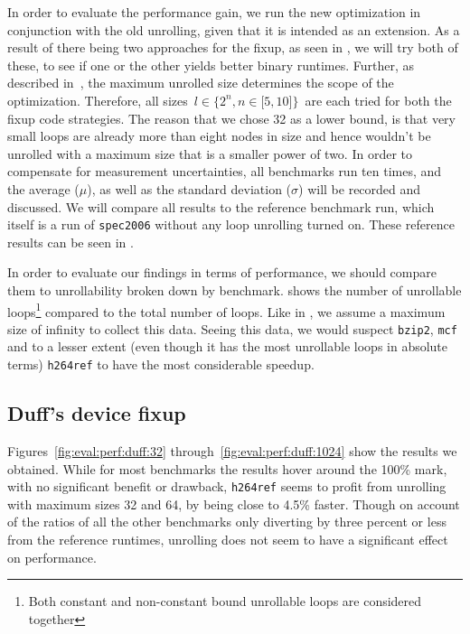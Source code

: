 In order to evaluate the performance gain, we run the new optimization in conjunction with the old unrolling, given that it is intended as an extension.
As a result of there being two approaches for the fixup, as seen in , we will try both of these, to see if one or the other yields better binary runtimes.
Further, as described in~, the maximum unrolled size determines  the scope of the optimization.
Therefore, all sizes~$l \in \{2^n, n \in \lbrack 5, 10 \rbrack \}$~are each tried for both the fixup code strategies.
The reason that we chose 32 as a lower bound, is that very small loops are already more than eight nodes in size and hence wouldn't be unrolled with a maximum size that is a smaller power of two.
In order to compensate for measurement uncertainties, all benchmarks run ten times, and the average ($\mu$), as well as the standard deviation ($\sigma$) will be recorded and discussed.
We will compare all results to the reference benchmark run, which itself is a run of \texttt{spec2006} without any loop unrolling turned on.
These reference results can be seen in .

In order to evaluate our findings in terms of performance, we should compare them to unrollability broken down by benchmark.
 shows the number of unrollable loops\footnote{Both constant and non-constant bound unrollable loops are considered together} compared to the total number of loops.
Like in , we assume a maximum size of infinity to collect this data.
Seeing this data, we would suspect \texttt{bzip2}, \texttt{mcf} and to a lesser extent (even though it has the most unrollable loops in absolute terms) \texttt{h264ref} to have the most considerable speedup.





\subsection{Duff's device fixup}\label{sec:eval:perf:duff}

Figures~\ref{fig:eval:perf:duff:32} through~\ref{fig:eval:perf:duff:1024} show the results we obtained.
While for most benchmarks the results hover around the 100\% mark, with no significant benefit or drawback, \texttt{h264ref} seems to profit from unrolling with maximum sizes 32 and 64, by being close to 4.5\% faster.
Though on account of the ratios of all the other benchmarks only diverting by three percent or less from the reference runtimes, unrolling does not seem to have a significant effect on performance.

